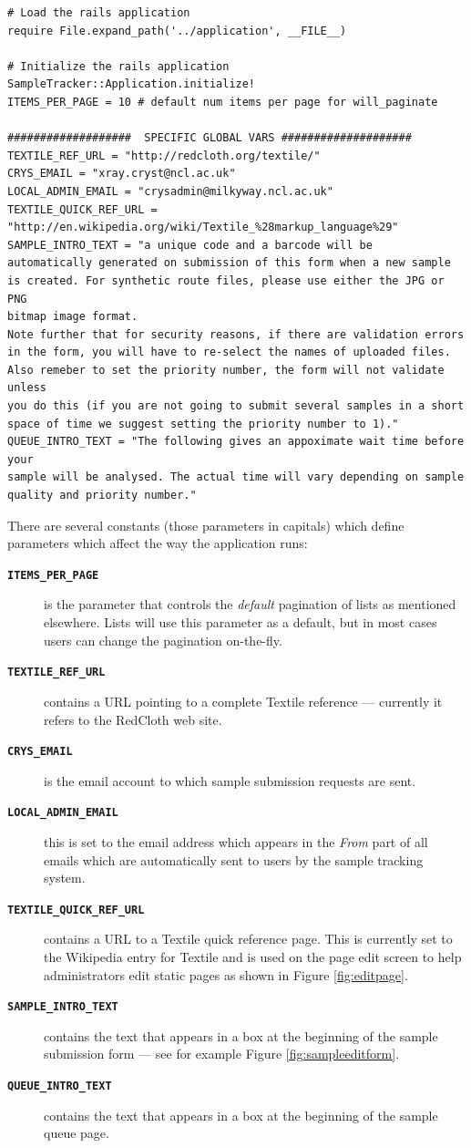\documentclass[12pt,twoside]{article}
\begin{document}
\tiny
\begin{verbatim}
# Load the rails application
require File.expand_path('../application', __FILE__)

# Initialize the rails application
SampleTracker::Application.initialize!
ITEMS_PER_PAGE = 10 # default num items per page for will_paginate

###################  SPECIFIC GLOBAL VARS ####################
TEXTILE_REF_URL = "http://redcloth.org/textile/"
CRYS_EMAIL = "xray.cryst@ncl.ac.uk"
LOCAL_ADMIN_EMAIL = "crysadmin@milkyway.ncl.ac.uk"
TEXTILE_QUICK_REF_URL = "http://en.wikipedia.org/wiki/Textile_%28markup_language%29"
SAMPLE_INTRO_TEXT = "a unique code and a barcode will be
automatically generated on submission of this form when a new sample
is created. For synthetic route files, please use either the JPG or PNG
bitmap image format.
Note further that for security reasons, if there are validation errors
in the form, you will have to re-select the names of uploaded files.
Also remeber to set the priority number, the form will not validate unless
you do this (if you are not going to submit several samples in a short
space of time we suggest setting the priority number to 1)."
QUEUE_INTRO_TEXT = "The following gives an appoximate wait time before your 
sample will be analysed. The actual time will vary depending on sample 
quality and priority number."
\end{verbatim}
\normalsize

There are several constants (those parameters in capitals) which define
parameters which affect the way the application runs:
\begin{description}
\item[\texttt{\textbf{ITEMS\_PER\_PAGE}}]
is the parameter that controls the \emph{default} pagination of lists
as mentioned elsewhere. Lists will use this parameter as a default, but
in most cases users can change the pagination on-the-fly.
\item[\texttt{\textbf{TEXTILE\_REF\_URL}}]
contains a URL pointing to a complete Textile reference --- currently
it refers to the RedCloth web site.
\item[\texttt{\textbf{CRYS\_EMAIL}}]
is the email account to which sample submission requests are sent.
\item[\texttt{\textbf{LOCAL\_ADMIN\_EMAIL}}]
this is set to the email address which appears in the \emph{From}
part of all emails which are automatically sent to users by the sample
tracking system.
\item[\texttt{\textbf{TEXTILE\_QUICK\_REF\_URL}}]
contains a URL to a Textile quick reference page. This is currently set
to the Wikipedia entry for Textile and is used on the page edit screen
to help administrators edit static pages as shown in Figure \ref{fig:editpage}.
\item[\texttt{\textbf{SAMPLE\_INTRO\_TEXT}}]
contains the text that appears in a box at the beginning of the sample
submission form --- see for example Figure \ref{fig:sampleeditform}. 
\item[\texttt{\textbf{QUEUE\_INTRO\_TEXT}}]
contains the text that appears in a box at the beginning of the sample
queue page.
\end{description}
\end{document}
